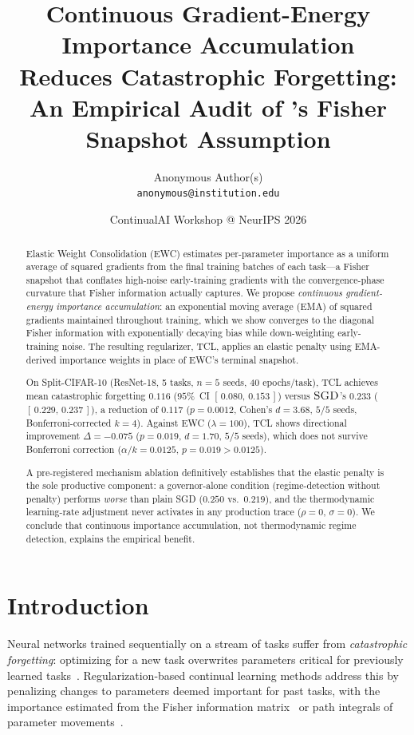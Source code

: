 \documentclass[10pt,letterpaper]{article}
\title{Continuous Gradient-Energy Importance Accumulation\\
Reduces Catastrophic Forgetting:\\
An Empirical Audit of \EWC{}'s Fisher Snapshot Assumption}
\author{
  Anonymous Author(s)\\
  \texttt{anonymous@institution.edu}
}
\date{ContinualAI Workshop @ NeurIPS 2026}
\newcommand{\TCL}{\textsc{TCL}}
\newcommand{\EWC}{\textsc{EWC}}
\newcommand{\SGD}{\textsc{SGD}}
\newcommand{\CI}[2]{[\,{#1},\,{#2}\,]}
\begin{document}
\maketitle

\begin{abstract}
Elastic Weight Consolidation (\EWC) estimates per-parameter importance as a
uniform average of squared gradients from the final training batches of each
task---a Fisher snapshot that conflates high-noise early-training gradients
with the convergence-phase curvature that Fisher information actually captures.
We propose \emph{continuous gradient-energy importance accumulation}: an
exponential moving average (EMA) of squared gradients maintained throughout
training, which we show converges to the diagonal Fisher information with
exponentially decaying bias while down-weighting early-training noise.
The resulting regularizer, \TCL{}, applies an elastic penalty using EMA-derived
importance weights in place of \EWC{}'s terminal snapshot.

On Split-CIFAR-10 (ResNet-18, 5 tasks, $n{=}5$ seeds, 40 epochs/task), \TCL{}
achieves mean catastrophic forgetting $0.116$
($95\%$~CI $\CI{0.080}{0.153}$) versus $\SGD$'s $0.233$
($\CI{0.229}{0.237}$), a reduction of $0.117$
($p{=}0.0012$, Cohen's $d{=}3.68$, $5/5$ seeds, Bonferroni-corrected $k{=}4$).
Against \EWC{} ($\lambda{=}100$), \TCL{} shows directional improvement
$\Delta{=}{-}0.075$ ($p{=}0.019$, $d{=}1.70$, $5/5$ seeds),
which does not survive Bonferroni correction
($\alpha/k{=}0.0125$, $p{=}0.019 > 0.0125$).

A pre-registered mechanism ablation definitively establishes that the elastic
penalty is the sole productive component: a governor-alone condition (regime-detection
without penalty) performs \emph{worse} than plain \SGD{} ($0.250$ vs.\ $0.219$),
and the thermodynamic learning-rate adjustment never activates in any production trace
($\rho{=}0$, $\sigma{=}0$).
We conclude that continuous importance accumulation, not thermodynamic regime detection,
explains the empirical benefit.
\end{abstract}

\section{Introduction}

Neural networks trained sequentially on a stream of tasks suffer from
\emph{catastrophic forgetting}: optimizing for a new task overwrites parameters
critical for previously learned tasks~\cite{McCloskey1989}.
Regularization-based continual learning methods address this by penalizing changes
to parameters deemed important for past tasks, with the importance estimated from
the Fisher information matrix~\cite{Kirkpatrick2017} or path integrals of parameter
movements~\cite{Zenke2017}.
\end{document}
